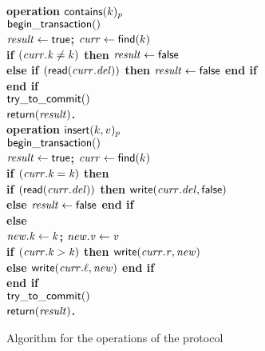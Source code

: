 \begin{figure}[h!]
{{\begin{minipage}[t]{150mm}
\begin{tabbing}
\bf{operation} $\act{contains}(k)_p$ \\
		 \> $\lit{begin\_transaction}()$ \\
		 \> $\ms{result} \gets \lit{true}$; $\ms{curr} \gets \lit{find}(k)$ \label{sline:cont-find} \\
		 \> \bf{if} $(\ms{curr.k} \neq k)$ \bf{then} $\ms{result} \gets \lit{false}$ \label{sline:cont-neq} \\
		 \>\> \bf{else if} $(\lit{read}(\ms{curr.del}))$ \bf{then} $\ms{result} \gets \lit{false}$ \bf{end if} \label{sline:del-cont} \\
		 \> \bf{end if} \\
		 \> $\lit{try\_to\_commit}()$ \\
		 \> $\sf{return}(\ms{result})$. \label{sline:cont-return} \\

   		
\bf{operation} $\act{insert}(k,v)_p$ \\
		 \> $\lit{begin\_transaction}()$ \\
		 \> $\ms{result} \gets \lit{true}$; $\ms{curr} \gets \lit{find}(k)$  \label{sline:find-ins} \\
		 \> \bf{if} $(\ms{curr.k} = \ms{k})$ \bf{then} \\
		 \>\>\> \bf{if} $(\lit{read}(\ms{curr.del}))$ \bf{then} $\lit{write}(\ms{curr.del}, \lit{false})$ \label{sline:del-false-ins} \label{sline:del-ins} \\
						
		 \>\>\>\> \bf{else} $\ms{result} \gets \lit{false}$ \bf{end if} \label{sline:false-ins} \\
		 \>\> \bf{else}  \label{sline:new-node} \\
		 \>\>\> $\ms{new.k} \gets \ms{k}$; $\ms{new.v} \gets \ms{v}$ \\
		 \>\>\> \bf{if} $(\ms{curr.k} > \ms{k})$ \bf{then} $\lit{write}(\ms{curr.r},\ms{new})$ \label{sline:start-ins} \\
		 \>\>\>\> \bf{else} $\lit{write}(\ms{curr.\ell}, \ms{new})$ \bf{end if} \label{sline:end-ins} \\
		 \> \bf{end if} \\
		 \> $\lit{try\_to\_commit}()$ \\
		 \> $\sf{return}(\ms{result})$. \label{sline:insert-return} \\
   		

\end{tabbing}
\normalsize
\end{minipage}
}
\caption{Algorithm for the operations of the protocol}
\label{fig:ttc-protocol}
}
\end{figure}
   		
